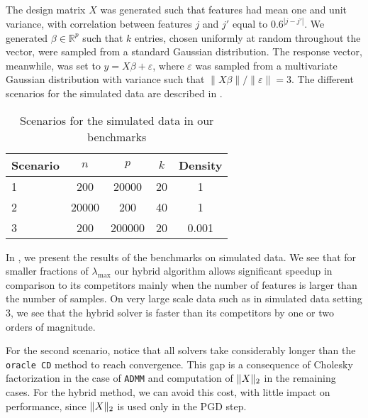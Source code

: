 The design matrix $X$ was generated such that features had mean one and unit variance, with correlation between features $j$ and $j'$ equal to $0.6^{|j-j'|}$.
We generated \(\beta \in \mathbb{R}^p\) such that \(k\) entries, chosen uniformly at random throughout the vector, were sampled from a standard Gaussian distribution.
The response vector, meanwhile, was set to $y=X\beta + \varepsilon$, where
$\varepsilon$ was sampled from a multivariate Gaussian distribution with variance such that $\lVert X\beta\rVert / \lVert \varepsilon \rVert = 3$.
The different scenarios for the simulated data are described in .

\begin{table}[hbt]
  \centering
  \caption{Scenarios for the simulated data in our benchmarks}
  \label{tab:simulated-data}
  \begin{tabular}{
      l
      S[table-format=5.0,round-mode=off]
      S[table-format=7.0,round-mode=off]
      S[table-format=2.0,round-mode=off]
      S[table-format=1.3,round-mode=off]
    }
    \toprule
    {Scenario} & {\(n\)} & {\(p\)} & {\(k\)} & {Density} \\           & 200     & 20000   & 20      & 1         \\
    2          & 20000   & 200     & 40      & 1         \\
    3          & 200     & 200000 & 20      & 0.001     \\ \bottomrule
  \end{tabular}
\end{table}

In , we present the results of the benchmarks on simulated data.
We see that for smaller fractions of $\lambda_{\text{max}}$ our hybrid algorithm allows significant speedup in comparison to its competitors mainly when the number of features is larger than the number of samples.
On very large scale data such as in simulated data setting $3$, we see that the hybrid solver is faster than its competitors by one or two orders of magnitude.


For the second scenario, notice that all solvers take considerably longer than the \texttt{oracle CD} method to reach convergence.
This gap is a consequence of Cholesky factorization in the case of \texttt{ADMM} and computation of \(\lVert {X} \rVert_2\) in the remaining cases.
For the hybrid method, we can avoid this cost, with little impact on performance, since \(\lVert {X} \rVert_2\) is used only in the PGD step.

